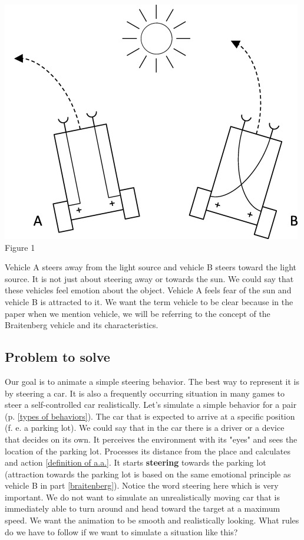 \documentclass[10pt,twoside,english,a4paper]{article}
\begin{document}
\bigbreak

\includegraphics[scale=0.33]{braitenberg.jpg}
\quad Figure 1
\bigbreak

Vehicle A steers away from the light source and vehicle B steers 
toward the light source. It is not just about steering away or 
towards the sun. We could say that these vehicles feel emotion about 
the object. Vehicle A feels fear of the sun and vehicle B is 
attracted to it. We want the term vehicle to be clear because in 
the paper when we mention vehicle, we will be referring to the 
concept of the Braitenberg vehicle and its characteristics. 

\subsection{Problem to solve} \label{problem to solve}

Our goal is to animate a simple steering behavior. The best way to represent
it is by steering a car. It is also a frequently occurring situation 
in many games to steer a self-controlled car realistically.
Let’s simulate a simple behavior for a pair 
(p. \ref{types of behaviors}). The car that 
is expected to arrive at a specific position (f. e. a parking lot). 
We could say that in the car there is a driver or a device that decides on its own.
It perceives the environment with its "eyes" and sees the location of the parking 
lot. Processes its distance from the place and calculates and action \ref{definition of a.a.}. 
It starts \textbf{steering} towards the parking lot (attraction towards the 
parking lot is based on the same emotional principle as vehicle B in part \ref{braitenberg}). 
Notice the word steering here which is very important. We do not want 
to simulate an unrealistically moving car that is immediately able to 
turn around and head toward the target at a maximum speed. We want the 
animation to be smooth and realistically looking. What rules do we 
have to follow if we want to simulate a situation like this?
\end{document}
